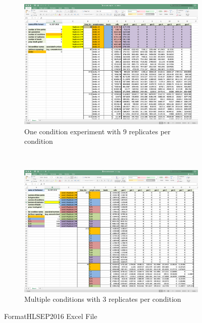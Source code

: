 \documentclass{article}
\begin{document}
\begin{figure}[h]
    \centering
    \begin{subfigure}[h]{1.0\linewidth}
        \centering
        \includegraphics[scale=0.16]{./img/FormatHLSEP2016-1}
        \caption{One condition experiment with 9 replicates per condition}
        \label{fig:FormatHLSEP2016-1}
    \end{subfigure}
    \\
    \begin{subfigure}[h]{1.0\linewidth}
        \centering
        \includegraphics[scale=0.16]{./img/FormatHLSEP2016-2}
        \caption{Multiple conditions with 3 replicates per condition}
        \label{fig:FormatHLSEP2016-2}
    \end{subfigure}
    \caption{FormatHLSEP2016 Excel File}
    \label{fig:FormatHLSEP2016}
\end{figure}
\end{document}

